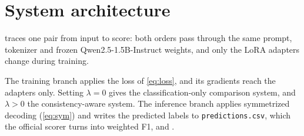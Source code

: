 \section{System architecture}
\label{sec:architecture}


 traces one pair from input to score: both orders pass through the same prompt, tokenizer and frozen Qwen2.5-1.5B-Instruct weights, and only the LoRA adapters change during training.

The training branch applies the loss of \cref{eq:loss}, and its gradients reach the adapters only. Setting $\lambda = 0$ gives the classification-only comparison system, and $\lambda > 0$ the consistency-aware system. The inference branch applies symmetrized decoding (\cref{eq:sym}) and writes the predicted labels to \texttt{predictions.csv}, which the official scorer turns into weighted F1, \SoftCons{} and \HardCons{}.
